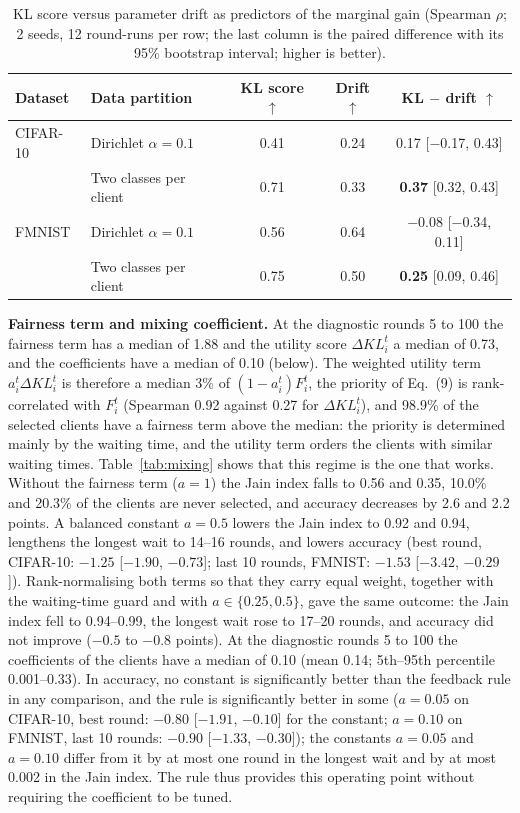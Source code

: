 \begin{table}[!htbp]
\centering
\footnotesize
\setlength{\tabcolsep}{4pt}
\renewcommand{\arraystretch}{1.08}
\caption{KL score versus parameter drift as predictors of the marginal gain (Spearman $\rho$; 2 seeds, 12 round-runs per row; the last column is the paired difference with its 95\% bootstrap interval; higher is better).}
\label{tab:kl_drift}
\begin{tabular*}{\journalfloatwidth}{@{\extracolsep{\fill}}llccc@{}}
\toprule
Dataset & Data partition & KL score $\uparrow$ & Drift $\uparrow$ & KL $-$ drift $\uparrow$ \\
\midrule
CIFAR-10 & Dirichlet $\alpha=0.1$ & 0.41 & 0.24 & 0.17 [$-$0.17, 0.43] \\
         & Two classes per client & 0.71 & 0.33 & \textbf{0.37} [0.32, 0.43] \\
FMNIST   & Dirichlet $\alpha=0.1$ & 0.56 & 0.64 & $-$0.08 [$-$0.34, 0.11] \\
         & Two classes per client & 0.75 & 0.50 & \textbf{0.25} [0.09, 0.46] \\
\bottomrule
\end{tabular*}
\end{table}

\textbf{Fairness term and mixing coefficient.} At the diagnostic rounds 5 to 100 the fairness term has a median of 1.88 and the utility score $\Delta KL_i^t$ a median of 0.73, and the coefficients have a median of 0.10 (below). The weighted utility term $a_i^t\Delta KL_i^t$ is therefore a median 3\% of $(1-a_i^t)F_i^t$, the priority of Eq.~(9) is rank-correlated with $F_i^t$ (Spearman 0.92 against 0.27 for $\Delta KL_i^t$), and 98.9\% of the selected clients have a fairness term above the median: the priority is determined mainly by the waiting time, and the utility term orders the clients with similar waiting times. Table~\ref{tab:mixing} shows that this regime is the one that works. Without the fairness term ($a=1$) the Jain index falls to 0.56 and 0.35, 10.0\% and 20.3\% of the clients are never selected, and accuracy decreases by 2.6 and 2.2 points. A balanced constant $a=0.5$ lowers the Jain index to 0.92 and 0.94, lengthens the longest wait to 14--16 rounds, and lowers accuracy (best round, CIFAR-10: $-1.25$ [$-1.90$, $-0.73$]; last 10 rounds, FMNIST: $-1.53$ [$-3.42$, $-0.29$]). Rank-normalising both terms so that they carry equal weight, together with the waiting-time guard and with $a\in\{0.25,0.5\}$, gave the same outcome: the Jain index fell to 0.94--0.99, the longest wait rose to 17--20 rounds, and accuracy did not improve ($-0.5$ to $-0.8$ points). At the diagnostic rounds 5 to 100 the coefficients of the clients have a median of 0.10 (mean 0.14; 5th--95th percentile 0.001--0.33). In accuracy, no constant is significantly better than the feedback rule in any comparison, and the rule is significantly better in some ($a=0.05$ on CIFAR-10, best round: $-0.80$ [$-1.91$, $-0.10$] for the constant; $a=0.10$ on FMNIST, last 10 rounds: $-0.90$ [$-1.33$, $-0.30$]); the constants $a=0.05$ and $a=0.10$ differ from it by at most one round in the longest wait and by at most 0.002 in the Jain index. The rule thus provides this operating point without requiring the coefficient to be tuned.

